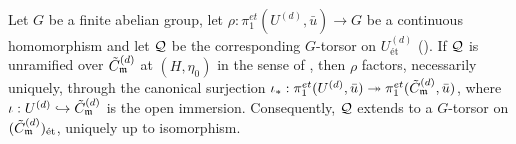 \begin{prop}\label{prop:extension_via_purity_short}
    Let $G$ be a finite abelian group, let $\rho : \pi_1^{et}(U^{(d)}, \bar{u}) \to G$ be a
    continuous homomorphism and let $\mathcal{Q}$ be the corresponding $G$-torsor on
    $U^{(d)}_{\text{\'et}}$ ().
    If $\mathcal{Q}$ is unramified over $\tilde{C}_{\mathfrak{m}}^{(d)}$ at $(H, \eta_0)$ in the sense of
    , then $\rho$ factors, necessarily uniquely,
    through the canonical surjection
    $\iota_* : \pi_1^{et}(U^{(d)}, \bar{u}) \twoheadrightarrow \pi_1^{et}(\tilde{C}_{\mathfrak{m}}^{(d)}, \bar{u})$,
    where $\iota : U^{(d)} \hookrightarrow \tilde{C}_{\mathfrak{m}}^{(d)}$ is the open immersion.
    Consequently, $\mathcal{Q}$ extends to a $G$-torsor on $(\tilde{C}_{\mathfrak{m}}^{(d)})_{\text{\'et}}$, uniquely up
    to isomorphism.
\end{prop}
